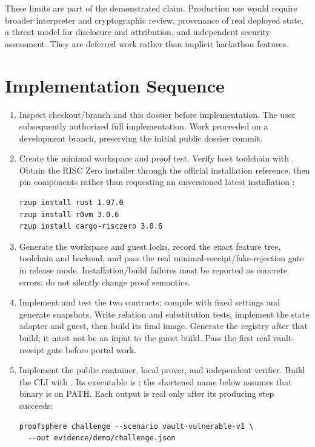 \documentclass[11pt]{article}
\newcommand{\filepath}[1]{\path{#1}}
\begin{document}
These limits are part of the demonstrated claim. Production use would require broader interpreter and cryptographic review, provenance of real deployed state, a threat model for disclosure and attribution, and independent security assessment. They are deferred work rather than implicit hackathon features.

\section{Implementation Sequence}
\begin{enumerate}
\item Inspect checkout/branch and this dossier before implementation. The user subsequently authorized full implementation. Work proceeded on a development branch, preserving the initial public dossier commit.
\item Create the minimal workspace and proof test. Verify host toolchain with . Obtain the RISC Zero installer through the official installation reference, then pin components rather than requesting an unversioned latest installation \cite{risc0install,risc0rust}:
\begin{verbatim}
rzup install rust 1.97.0
rzup install r0vm 3.0.6
rzup install cargo-risczero 3.0.6
\end{verbatim}
\item Generate the workspace and guest locks, record the exact feature tree, toolchain and backend, and pass the real minimal-receipt/fake-rejection gate in release mode. Installation/build failures must be reported as concrete errors; do not silently change proof semantics.
\item Implement and test the two contracts; compile with fixed settings and generate snapshots. Write relation and substitution tests, implement the state adapter and guest, then build its final image. Generate the registry after that build; it must not be an input to the guest build. Pass the first real vault-receipt gate before portal work.
\item Implement the public container, local prover, and independent verifier. Build the CLI with . Its executable is \filepath{target/release/proofsphere}; the shortened name below assumes that binary is on PATH. Each output is real only after its producing step succeeds:
\begin{verbatim}
proofsphere challenge --scenario vault-vulnerable-v1 \
  --out evidence/demo/challenge.json

\end{verbatim}
\end{enumerate}
\end{document}
